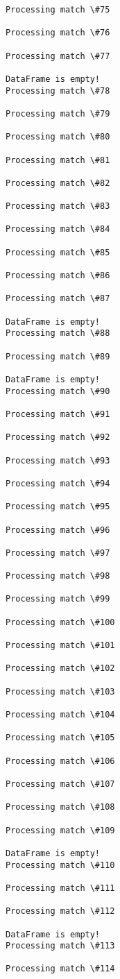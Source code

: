 \documentclass[11pt]{article}
\begin{document}
\begin{Verbatim}[commandchars=\\\{\}]
Processing match \#75

Processing match \#76

Processing match \#77

DataFrame is empty!
Processing match \#78

Processing match \#79

Processing match \#80

Processing match \#81

Processing match \#82

Processing match \#83

Processing match \#84

Processing match \#85

Processing match \#86

Processing match \#87

DataFrame is empty!
Processing match \#88

Processing match \#89

DataFrame is empty!
Processing match \#90

Processing match \#91

Processing match \#92

Processing match \#93

Processing match \#94

Processing match \#95

Processing match \#96

Processing match \#97

Processing match \#98

Processing match \#99

Processing match \#100

Processing match \#101

Processing match \#102

Processing match \#103

Processing match \#104

Processing match \#105

Processing match \#106

Processing match \#107

Processing match \#108

Processing match \#109

DataFrame is empty!
Processing match \#110

Processing match \#111

Processing match \#112

DataFrame is empty!
Processing match \#113

Processing match \#114


\end{Verbatim}
\end{document}
